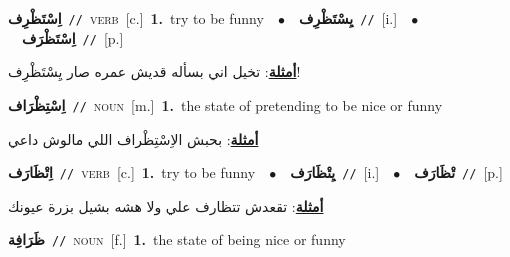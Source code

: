 \documentclass[10pt,a4paper,twoside]{article} %
\begin{document}
\begin{multicols}{2}
{{\setlength\topsep{0pt}\textbf{\foreignlanguage{arabic}{اِسْتَظْرِف}}\ {\color{gray}\texttt{//}\color{black}}\ \textsc{verb}\ [c.]\ \textbf{1.}~try to be funny\ \ $\bullet$\ \ \setlength\topsep{0pt}\textbf{\foreignlanguage{arabic}{يِسْتَظْرِف}}\ {\color{gray}\texttt{//}\color{black}}\ [i.]\ \ $\bullet$\ \ \setlength\topsep{0pt}\textbf{\foreignlanguage{arabic}{اِسْتَظْرَف}}\ {\color{gray}\texttt{//}\color{black}}\ [p.]\  \begin{flushright}\color{gray}\foreignlanguage{arabic}{\textbf{\underline{\foreignlanguage{arabic}{أمثلة}}}: تخيل اني بسأله قديش عمره صار يِسْتَظْرِف!}\end{flushright}\color{black}} \vspace{2mm}

{\setlength\topsep{0pt}\textbf{\foreignlanguage{arabic}{اِسْتِظْرَاف}}\ {\color{gray}\texttt{//}\color{black}}\ \textsc{noun}\ [m.]\ \textbf{1.}~the state of pretending to be nice or funny\  \begin{flushright}\color{gray}\foreignlanguage{arabic}{\textbf{\underline{\foreignlanguage{arabic}{أمثلة}}}: بحبش الاِسْتِظْراف اللي مالوش داعي}\end{flushright}\color{black}} \vspace{2mm}

{\setlength\topsep{0pt}\textbf{\foreignlanguage{arabic}{اِتْظَارَف}}\ {\color{gray}\texttt{//}\color{black}}\ \textsc{verb}\ [c.]\ \textbf{1.}~try to be funny\ \ $\bullet$\ \ \setlength\topsep{0pt}\textbf{\foreignlanguage{arabic}{يِتْظَارَف}}\ {\color{gray}\texttt{//}\color{black}}\ [i.]\ \ $\bullet$\ \ \setlength\topsep{0pt}\textbf{\foreignlanguage{arabic}{تْظَارَف}}\ {\color{gray}\texttt{//}\color{black}}\ [p.]\  \begin{flushright}\color{gray}\foreignlanguage{arabic}{\textbf{\underline{\foreignlanguage{arabic}{أمثلة}}}: تقعدش تتظارف علي ولا هشه بشيل بزرة عيونك}\end{flushright}\color{black}} \vspace{2mm}

{\setlength\topsep{0pt}\textbf{\foreignlanguage{arabic}{ظَرَافِة}}\ {\color{gray}\texttt{//}\color{black}}\ \textsc{noun}\ [f.]\ \textbf{1.}~the state of being nice or funny\ 

}}
\end{multicols}
\end{document}
